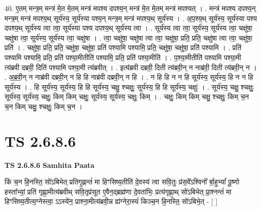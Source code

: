 \documentclass[17pt]{extarticle}
\begin{document}
40. ए॒तम् मन्त्र॒म् मन्त्र॑ मे॒त मे॒तम् मन्त्र॑ मपश्य दपश्य॒न् मन्त्र॑ मे॒त मे॒तम् मन्त्र॑ मपश्यत् । . मन्त्र॑ मपश्य दपश्य॒न् मन्त्र॒म् मन्त्र॑ मपश्य॒थ् सूर्य॑स्य॒ सूर्य॑स्या पश्य॒न् मन्त्र॒म् मन्त्र॑ मपश्य॒थ् सूर्य॑स्य । . अ॒प॒श्य॒थ् सूर्य॑स्य॒ सूर्य॑स्या पश्य दपश्य॒थ् सूर्य॑स्य त्वा त्वा॒ सूर्य॑स्या पश्य दपश्य॒थ् सूर्य॑स्य त्वा । . सूर्य॑स्य त्वा त्वा॒ सूर्य॑स्य॒ सूर्य॑स्य त्वा॒ चक्षु॑षा॒ चक्षु॑षा त्वा॒ सूर्य॑स्य॒ सूर्य॑स्य त्वा॒ चक्षु॑षा । . त्वा॒ चक्षु॑षा॒ चक्षु॑षा त्वा त्वा॒ चक्षु॑षा॒ प्रति॒ प्रति॒ चक्षु॑षा त्वा त्वा॒ चक्षु॑षा॒ प्रति॑ । . चक्षु॑षा॒ प्रति॒ प्रति॒ चक्षु॑षा॒ चक्षु॑षा॒ प्रति॑ पश्यामि पश्यामि॒ प्रति॒ चक्षु॑षा॒ चक्षु॑षा॒ प्रति॑ पश्यामि । . प्रति॑ पश्यामि पश्यामि॒ प्रति॒ प्रति॑ पश्या॒मीतीति॑ पश्यामि॒ प्रति॒ प्रति॑ पश्या॒मीति॑ । . प॒श्या॒मीतीति॑ पश्यामि पश्या॒मी त्य॑ब्रवी दब्रवी॒ दिति॑ पश्यामि पश्या॒मी त्य॑ब्रवीत् । . इत्य॑ब्रवी दब्रवी॒ दिती त्य॑ब्रवी॒न् न नाब्र॑वी॒ दिती त्य॑ब्रवी॒न् न । . अ॒ब्र॒वी॒न् न नाब्र॑वी दब्रवी॒न् न हि हि नाब्र॑वी दब्रवी॒न् न हि । . न हि हि न न हि सूर्य॑स्य॒ सूर्य॑स्य॒ हि न न हि सूर्य॑स्य । . हि सूर्य॑स्य॒ सूर्य॑स्य॒ हि हि सूर्य॑स्य॒ चक्षु॒ श्चक्षुः॒ सूर्य॑स्य॒ हि हि सूर्य॑स्य॒ चक्षुः॑ । . सूर्य॑स्य॒ चक्षु॒ श्चक्षुः॒ सूर्य॑स्य॒ सूर्य॑स्य॒ चक्षुः॒ किम् किम् चक्षुः॒ सूर्य॑स्य॒ सूर्य॑स्य॒ चक्षुः॒ किम् । . चक्षुः॒ किम् किम् चक्षु॒ श्चक्षुः॒ किम् च॒न च॒न किम् चक्षु॒ श्चक्षुः॒ किम् च॒न । \newline
\pagebreak
{}

\section{ TS 2.6.8.6 }

\textbf{TS 2.6.8.6 } \newline
\textbf{Samhita Paata} \newline

किं च॒न हि॒नस्ति॒ सो॑ऽबिभेत् प्रतिगृ॒ह्णन्तं॑ मा हिꣳसिष्य॒तीति॑ दे॒वस्य॑ त्वा सवि॒तुः प्र॑स॒वे᳚ऽश्विनो᳚ र्बा॒हुभ्यां᳚ पू॒ष्णो हस्ता᳚भ्यां॒ प्रति॑ गृह्णा॒मीत्य॑ब्रवीथ् सवि॒तृप्र॑सूत ए॒वैन॒द्ब्रह्म॑णा दे॒वता॑भिः॒ प्रत्य॑गृह्णा॒थ् सो॑ऽबिभेत् प्रा॒श्नन्तं॑ मा हिꣳसिष्य॒तीत्य॒ग्नेस्त्वा॒ ऽऽस्ये॑न॒ प्राश्ना॒मीत्य॑ब्रवी॒न्न ह्य॑ग्नेरा॒स्यं॑ किञ्च॒न हि॒नस्ति॒ सो॑ऽबिभे॒त् - [  ] \newline
\end{document}
